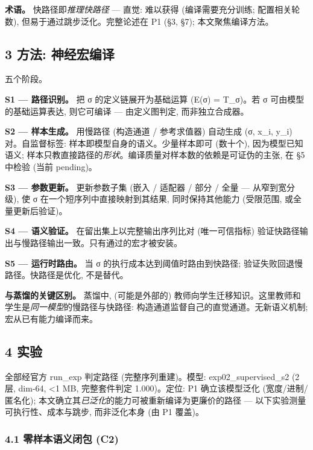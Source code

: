 \documentclass[
]{article}
\begin{document}
\textbf{术语。} 快路径即\emph{推理快路径} --- 直觉: 难以获得
(编译需要充分训练; 配置相关轮数), 但易于通过跳步泛化。完整论述在 P1 (§3,
§7); 本文聚焦编译方法。

\subsection{3 方法:
神经宏编译}\label{ux65b9ux6cd5-ux795eux7ecfux5b8fux7f16ux8bd1}

五个阶段。

\textbf{S1 --- 路径识别。} 把 σ 的定义链展开为基础运算 (E(σ) = T\_σ)。若
σ 可由模型的基础运算表达, 则它可编译 --- 由定义图判定, 而非独立合成器。

\textbf{S2 --- 样本生成。} 用慢路径 (构造通道 / 参考求值器) 自动生成 (σ,
x\_i, y\_i) 对。自监督标签: 样本即模型自身的语义。少量样本即可 (数十个),
因为模型已知语义;
样本只教直接路径的\emph{形状}。编译质量对样本数的依赖是可证伪的主张, 在
§5 中检验 (当前 pending)。

\textbf{S3 --- 参数更新。} 更新参数子集 (嵌入 / 适配器 / 部分 / 全量 ---
从窄到宽分级), 使 σ 在一个短序列中直接映射到其结果, 同时保持其他能力
(受限范围, 或全量更新后验证)。

\textbf{S4 --- 语义验证。} 在留出集上以完整输出序列比对 (唯一可信指标)
验证快路径输出与慢路径输出一致。只有通过的宏才被安装。

\textbf{S5 --- 运行时路由。} 当 σ 的执行成本达到阈值时路由到快路径;
验证失败回退慢路径。快路径是优化, 不是替代。

\textbf{与蒸馏的关键区别。} 蒸馏中, (可能是外部的)
教师向学生迁移知识。这里教师和学生是\emph{同一模型}的慢路径与快路径:
构造通道监督自己的直觉通道。无新语义机制; 宏从已有能力编译而来。

\subsection{4 实验}\label{ux5b9eux9a8c}

全部经官方 run\_exp 判定路径 (完整序列重建)。模型: exp02\_supervised\_s2
(2 层, dim-64, \textless1 MB, 完整套件判定 1.000)。定位: P1
确立该模型泛化 (宽度/进制/匿名化);
本文确立其\emph{已泛化}的能力可被重新编译为更廉价的路径 ---
以下实验测量可执行性、成本与跳步, 而非泛化本身 (由 P1 覆盖)。

\subsubsection{4.1 零样本语义闭包
(C2)}\label{ux96f6ux6837ux672cux8bedux4e49ux95edux5305-c2}
\end{document}
